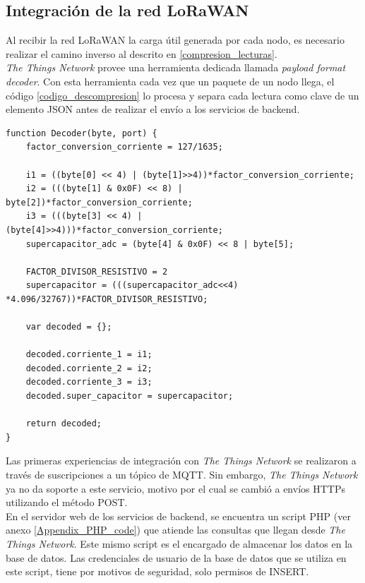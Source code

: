 \subsection{Integraci\'{o}n de la red LoRaWAN}
\label{seccion_lorawan}
Al recibir la red LoRaWAN la carga útil generada por cada nodo, es necesario realizar el camino inverso al descrito en \ref{compresion_lecturas}.\\
\textit{The Things Network} provee una herramienta dedicada llamada \textit{payload format decoder}. Con esta herramienta cada vez que un paquete de un nodo llega, el código \ref{codigo_descompresion} lo procesa y separa cada lectura como clave de un elemento JSON antes de realizar el env\'{i}o a los servicios de backend.\\
\begin{lstlisting}[label=codigo_descompresion,caption=Función encargada de descomprimir las 4 lecturas de 12 bits.]
function Decoder(byte, port) {
	factor_conversion_corriente = 127/1635;
	
	i1 = ((byte[0] << 4) | (byte[1]>>4))*factor_conversion_corriente;
	i2 = (((byte[1] & 0x0F) << 8) | byte[2])*factor_conversion_corriente;
	i3 = (((byte[3] << 4) | (byte[4]>>4)))*factor_conversion_corriente;
	supercapacitor_adc = (byte[4] & 0x0F) << 8 | byte[5];
	
	FACTOR_DIVISOR_RESISTIVO = 2
	supercapacitor = (((supercapacitor_adc<<4) *4.096/32767))*FACTOR_DIVISOR_RESISTIVO;	
	
	var decoded = {};

	decoded.corriente_1 = i1;
	decoded.corriente_2 = i2;
	decoded.corriente_3 = i3;
	decoded.super_capacitor = supercapacitor;

	return decoded;  
}   

\end{lstlisting}
Las primeras experiencias de integración con \textit{The Things Network} se realizaron a través de suscripciones a un tópico de MQTT. Sin embargo, \textit{The Things Network} ya no da soporte a este servicio, motivo por el cual se cambió a envíos HTTPs utilizando el método POST.\\
En el servidor web de los servicios de backend, se encuentra un script PHP (ver anexo \ref{Appendix_PHP_code}) que atiende las consultas que llegan desde \textit{The Things Network}. Este mismo script es el encargado de almacenar los datos en la base de datos. Las credenciales de usuario de la base de datos que se utiliza en este script, tiene por motivos de seguridad, solo permisos de INSERT.\\

